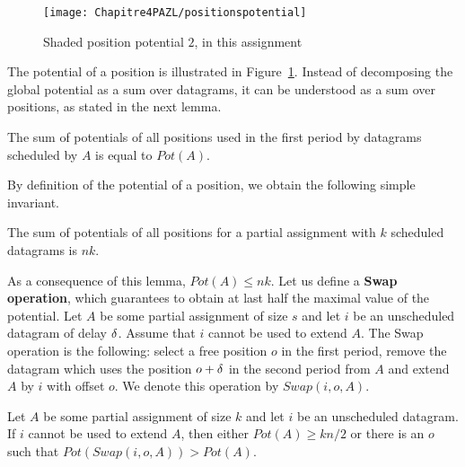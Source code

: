 \begin{figure}
 \begin{center}
\texttt{[image: Chapitre4PAZL/positionspotential]}
\end{center}
\caption{Shaded position potential $2$, in this assignment}
\label{fig:positionpotential} 
\end{figure}

The potential of a position is illustrated in Figure~\ref{fig:positionpotential}.
Instead of decomposing the global potential as a sum over datagrams, it can be understood
as a sum over positions, as stated in the next lemma.

\begin{lemma}\label{lemma:pot_pos}
The sum of potentials of all positions used in the first period by datagrams scheduled by $A$ is equal to $Pot(A)$.  
\end{lemma}

By definition of the potential of a position, we obtain the following simple invariant.

\begin{lemma}\label{lemma:inv}
The sum of potentials of all positions for a partial assignment with $k$ scheduled datagrams is $nk$.  
\end{lemma}

 As a consequence of this lemma, $Pot(A) \leq nk$. Let us define a \textbf{Swap operation},
 which guarantees to obtain at last half the maximal value of the potential.
Let $A$ be some partial assignment of size $s$ and let $i$ be an unscheduled datagram of delay $\delta$. 
Assume that $i$ cannot be used to extend $A$. The Swap operation is the following: 
select a free position $o$ in the first period, remove the datagram which uses the position $o+\delta$ in the second period from $A$ and extend $A$ by $i$ with offset $o$. We denote this operation by $Swap(i,o,A)$.

\begin{lemma}\label{lemma:swap}
Let $A$ be some partial assignment of size $k$ and let $i$ be an unscheduled datagram. If $i$ cannot be used to extend $A$, then either $Pot(A) \geq kn/2$ or there is an $o$ such that $Pot(Swap(i,o,A)) > Pot(A)$.
\end{lemma}

